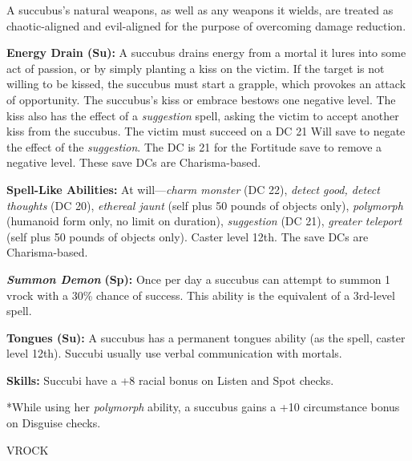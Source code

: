 \documentclass{article}
\begin{document}
A succubus's natural weapons, as well as any weapons it wields, are treated as 
chaotic-aligned and evil-aligned for the purpose of overcoming damage reduction.

\textbf{Energy Drain (Su): }A succubus drains energy from a mortal it lures into 
some act of passion, or by simply planting a kiss on the victim. If the target 
is not willing to be kissed, the succubus must start a grapple, which provokes 
an attack of opportunity. The succubus's kiss or embrace bestows one negative level. 
The kiss also has the effect of a \textit{suggestion }spell, asking the victim 
to accept another kiss from the succubus. The victim must succeed on a DC 21 Will 
save to negate the effect of the \textit{suggestion}. The DC is 21 for the Fortitude 
save to remove a negative level. These save DCs are Charisma-based.

\textbf{Spell-Like Abilities: }At will---\textit{charm monster }(DC 22), \textit{detect 
good, detect thoughts }(DC 20), \textit{ethereal jaunt }(self plus 50 pounds of 
objects only), \textit{polymorph }(humanoid form only, no limit on duration), \textit{suggestion 
}(DC 21), \textit{greater teleport }(self plus 50 pounds of objects only). Caster 
level 12th. The save DCs are Charisma-based.

\textit{\textbf{Summon Demon }}\textbf{(Sp):} Once per day a succubus can attempt 
to summon 1 vrock with a 30\% chance of success. This ability is the equivalent 
of a 3rd-level spell.

\textbf{Tongues (Su): }A succubus has a permanent tongues ability (as the spell, 
caster level 12th). Succubi usually use verbal communication with mortals.

\textbf{Skills:} Succubi have a +8 racial bonus on Listen and Spot checks.

*While using her \textit{polymorph }ability, a succubus gains a +10 circumstance 
bonus on Disguise checks.

\vspace{12pt}
VROCK
\end{document}
